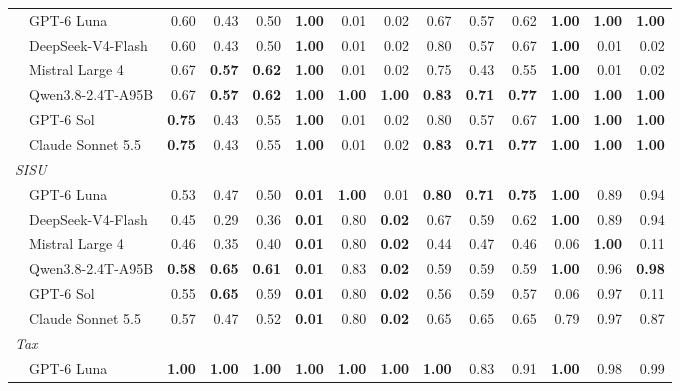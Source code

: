 \begin{table}[t]
\begin{tabular}{l@{\hspace{0.6em}}rrr@{\hspace{0.6em}}rrr@{\hspace{0.6em}}rrr@{\hspace{0.6em}}rrr}
  ~~GPT-6 Luna & 0.60 & 0.43 & 0.50 & \textbf{1.00} & 0.01 & 0.02 & 0.67 & 0.57 & 0.62 & \textbf{1.00} & \textbf{1.00} & \textbf{1.00} \\
  ~~DeepSeek-V4-Flash & 0.60 & 0.43 & 0.50 & \textbf{1.00} & 0.01 & 0.02 & 0.80 & 0.57 & 0.67 & \textbf{1.00} & 0.01 & 0.02 \\
  ~~Mistral Large 4 & 0.67 & \textbf{0.57} & \textbf{0.62} & \textbf{1.00} & 0.01 & 0.02 & 0.75 & 0.43 & 0.55 & \textbf{1.00} & 0.01 & 0.02 \\
  ~~Qwen3.8-2.4T-A95B & 0.67 & \textbf{0.57} & \textbf{0.62} & \textbf{1.00} & \textbf{1.00} & \textbf{1.00} & \textbf{0.83} & \textbf{0.71} & \textbf{0.77} & \textbf{1.00} & \textbf{1.00} & \textbf{1.00} \\
  ~~GPT-6 Sol & \textbf{0.75} & 0.43 & 0.55 & \textbf{1.00} & 0.01 & 0.02 & 0.80 & 0.57 & 0.67 & \textbf{1.00} & \textbf{1.00} & \textbf{1.00} \\
  ~~Claude Sonnet 5.5 & \textbf{0.75} & 0.43 & 0.55 & \textbf{1.00} & 0.01 & 0.02 & \textbf{0.83} & \textbf{0.71} & \textbf{0.77} & \textbf{1.00} & \textbf{1.00} & \textbf{1.00} \\
  \midrule
  \multicolumn{13}{l}{\textit{SISU}} \\
  ~~GPT-6 Luna & 0.53 & 0.47 & 0.50 & \textbf{0.01} & \textbf{1.00} & 0.01 & \textbf{0.80} & \textbf{0.71} & \textbf{0.75} & \textbf{1.00} & 0.89 & 0.94 \\
  ~~DeepSeek-V4-Flash & 0.45 & 0.29 & 0.36 & \textbf{0.01} & 0.80 & \textbf{0.02} & 0.67 & 0.59 & 0.62 & \textbf{1.00} & 0.89 & 0.94 \\
  ~~Mistral Large 4 & 0.46 & 0.35 & 0.40 & \textbf{0.01} & 0.80 & \textbf{0.02} & 0.44 & 0.47 & 0.46 & 0.06 & \textbf{1.00} & 0.11 \\
  ~~Qwen3.8-2.4T-A95B & \textbf{0.58} & \textbf{0.65} & \textbf{0.61} & \textbf{0.01} & 0.83 & \textbf{0.02} & 0.59 & 0.59 & 0.59 & \textbf{1.00} & 0.96 & \textbf{0.98} \\
  ~~GPT-6 Sol & 0.55 & \textbf{0.65} & 0.59 & \textbf{0.01} & 0.80 & \textbf{0.02} & 0.56 & 0.59 & 0.57 & 0.06 & 0.97 & 0.11 \\
  ~~Claude Sonnet 5.5 & 0.57 & 0.47 & 0.52 & \textbf{0.01} & 0.80 & \textbf{0.02} & 0.65 & 0.65 & 0.65 & 0.79 & 0.97 & 0.87 \\
  \midrule
  \multicolumn{13}{l}{\textit{Tax}} \\
  ~~GPT-6 Luna & \textbf{1.00} & \textbf{1.00} & \textbf{1.00} & \textbf{1.00} & \textbf{1.00} & \textbf{1.00} & \textbf{1.00} & 0.83 & 0.91 & \textbf{1.00} & 0.98 & 0.99 \\

\end{tabular}
\end{table}
